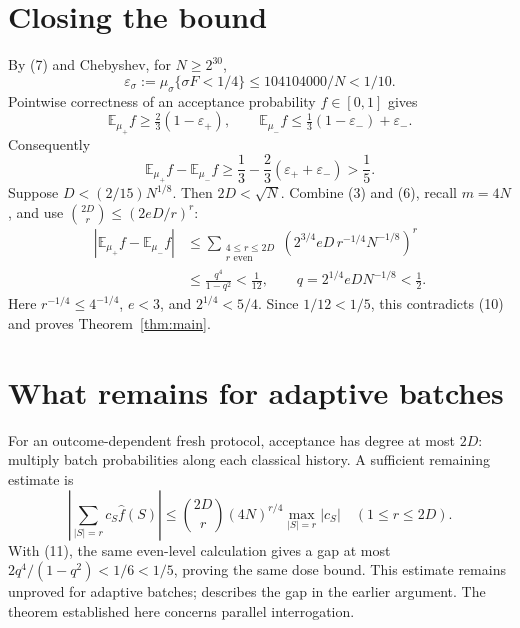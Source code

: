 \documentclass[11pt]{article}
\newcommand{\E}{\mathbb E}
\newcommand{\wh}{\widehat}
\begin{document}
\section{Closing the bound}
By (7) and Chebyshev, for $N\ge2^{30}$,
\[
 \varepsilon_\sigma:=\mu_\sigma\{\sigma F<1/4\}
 \le104104000/N<1/10.
 \tag{9}
\]
Pointwise correctness of an acceptance probability $f\in[0,1]$ gives
\[
 \E_{\mu_+}f\ge\tfrac23(1-\varepsilon_+),\qquad
 \E_{\mu_-}f\le\tfrac13(1-\varepsilon_-)+\varepsilon_-.
\]
Consequently
\[
 \E_{\mu_+}f-\E_{\mu_-}f
 \ge\frac13-\frac23(\varepsilon_++\varepsilon_-)>\frac15.
 \tag{10}
\]
Suppose $D<(2/15)N^{1/8}$. Then $2D<\sqrt N$.
Combine (3) and (6), recall $m=4N$, and use
$ {2D\choose r}\le(2eD/r)^r$:
\[
 \begin{split}
 |\E_{\mu_+}f-\E_{\mu_-}f|
 &\le\sum_{\substack{4\le r\le2D\\r\text{ even}}}
       \left(2^{3/4}eD\,r^{-1/4}N^{-1/8}\right)^r\\
 &\le\frac{q^4}{1-q^2}<\frac1{12},\qquad
 q=2^{1/4}eDN^{-1/8}<\frac12.
 \end{split}
\]
Here $r^{-1/4}\le4^{-1/4}$, $e<3$, and $2^{1/4}<5/4$.
Since $1/12<1/5$, this contradicts (10) and proves Theorem~\ref{thm:main}.

\section{What remains for adaptive batches}
For an outcome-dependent fresh protocol, acceptance has degree at most
$2D$: multiply batch probabilities along each classical history.
A sufficient remaining estimate is
\[
 \left|\sum_{|S|=r}c_S\wh f(S)\right|
 \le {2D\choose r}(4N)^{r/4}\max_{|S|=r}|c_S|
 \quad(1\le r\le2D).
 \tag{11}
\]
With (11), the same even-level calculation gives a gap at most
$2q^4/(1-q^2)<1/6<1/5$, proving the same dose bound.
This estimate remains unproved for adaptive batches; 
describes the gap in the earlier argument. The theorem established here
concerns parallel interrogation.
\end{document}
